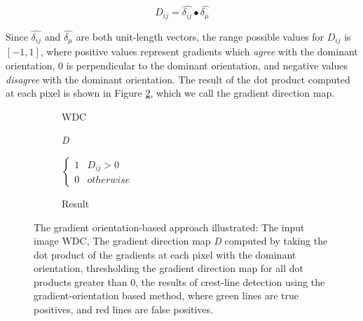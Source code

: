 \begin{equation}
D_{ij} = \hat{\delta_{ij}} \bullet \hat{\delta_{\mu}}
\end{equation}

Since $\hat{\delta_{ij}}$ and $\hat{\delta_{\mu}}$ are both unit-length vectors, the range possible values for $D_{ij}$ is $[-1, 1]$, where positive values represent gradients which \emph{agree} with the dominant orientation, 0 is perpendicular to the dominant orientation, and negative values \emph{disagree} with the dominant orientation. The result of the dot product computed at each pixel is shown in Figure \ref{fig:orientation_based_dot_product}, which we call the gradient direction map.

\begin{figure}
	\centering
	\begin{subfigure}{0.48\textwidth}
		\centering
		\caption{WDC}
		\label{fig:orientation_based_wdc}
	\end{subfigure}
	\begin{subfigure}{0.48\textwidth}
		\centering
		\caption{\emph{D}}
		\label{fig:orientation_based_dot_product}
	\end{subfigure}
	\begin{subfigure}{0.48\textwidth}
		\centering
		\caption{$\begin{cases}
				1 & D_{ij} > 0\\
				0 & otherwise
			\end{cases}$}
		\label{fig:orientation_based_threshold_dot_product}
	\end{subfigure}
	\begin{subfigure}{0.48\textwidth}
		\centering
		\caption{Result}
		\label{fig:orientation_based_results}
	\end{subfigure}
	\caption{The gradient orientation-based approach illustrated:  The input image WDC,  The gradient direction map \emph{D} computed by taking the dot product of the gradients at each pixel with the dominant orientation,  thresholding the gradient direction map for all dot products greater than 0,  the results of crest-line detection using the gradient-orientation based method, where green lines are true positives, and red lines are false positives. }
	\label{fig:orientation_based_process}
\end{figure}


